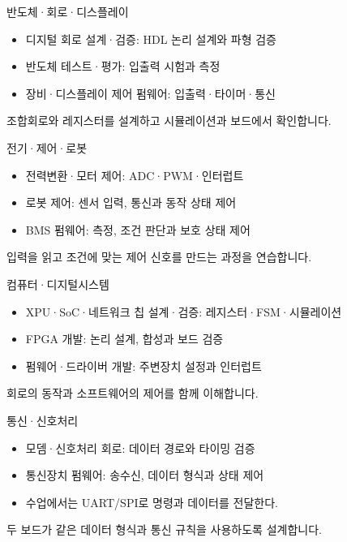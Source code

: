 \documentclass[aspectratio=169,11pt,t]{beamer}
\begin{document}
\begin{frame}{반도체·회로·디스플레이}
\begin{itemize}
\item 디지털 회로 설계·검증: HDL 논리 설계와 파형 검증
\item 반도체 테스트·평가: 입출력 시험과 측정
\item 장비·디스플레이 제어 펌웨어: 입출력·타이머·통신
\end{itemize}
\vspace{0.35cm}
조합회로와 레지스터를 설계하고 시뮬레이션과 보드에서 확인합니다.
\end{frame}

\begin{frame}{전기·제어·로봇}
\begin{itemize}
\item 전력변환·모터 제어: ADC·PWM·인터럽트
\item 로봇 제어: 센서 입력, 통신과 동작 상태 제어
\item BMS 펌웨어: 측정, 조건 판단과 보호 상태 제어
\end{itemize}
\vspace{0.35cm}
입력을 읽고 조건에 맞는 제어 신호를 만드는 과정을 연습합니다.
\end{frame}

\begin{frame}{컴퓨터·디지털시스템}
\begin{itemize}
\item XPU·SoC·네트워크 칩 설계·검증: 레지스터·FSM·시뮬레이션
\item FPGA 개발: 논리 설계, 합성과 보드 검증
\item 펌웨어·드라이버 개발: 주변장치 설정과 인터럽트
\end{itemize}
\vspace{0.35cm}
회로의 동작과 소프트웨어의 제어를 함께 이해합니다.
\end{frame}

\begin{frame}{통신·신호처리}
\begin{itemize}
\item 모뎀·신호처리 회로: 데이터 경로와 타이밍 검증
\item 통신장치 펌웨어: 송수신, 데이터 형식과 상태 제어
\item 수업에서는 UART/SPI로 명령과 데이터를 전달한다.
\end{itemize}
\vspace{0.35cm}
두 보드가 같은 데이터 형식과 통신 규칙을 사용하도록 설계합니다.
\end{frame}
\end{document}
